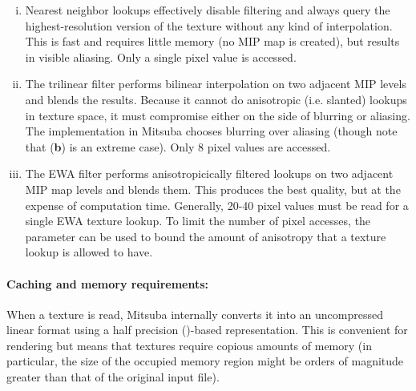 \begin{enumerate}[(i)]
\item Nearest neighbor lookups effectively disable filtering and always query the
highest-resolution version of the texture without any kind of interpolation. This is
fast and requires little memory (no MIP map is created), but results in visible aliasing.
Only a single pixel value is accessed.

\item The trilinear filter performs bilinear interpolation on two adjacent MIP levels
and blends the results. Because it cannot do anisotropic (i.e. slanted) lookups in texture space,
it must compromise either on the side of blurring or aliasing. The implementation in Mitsuba
chooses blurring over aliasing (though note that (\textbf{b}) is an extreme case).
Only 8 pixel values are accessed.

\item The EWA filter performs anisotropicically filtered lookups on two adjacent MIP map levels
and blends them. This produces the best quality, but at the expense of computation time.
Generally, 20-40 pixel values must be read for a single EWA texture lookup. To limit
the number of pixel accesses, the  parameter can be used to bound
the amount of anisotropy that a texture lookup is allowed to have.
\end{enumerate}
\paragraph{Caching and memory requirements:}
When a texture is read, Mitsuba internally converts it into an uncompressed linear format
using a half precision ()-based representation. This is convenient for
rendering but means that textures require copious amounts of memory (in particular, the
size of the occupied memory region might be orders of magnitude greater than that of the
original input file).

